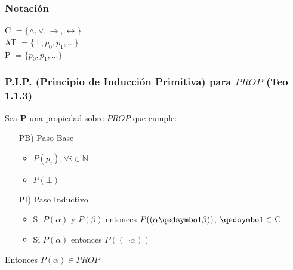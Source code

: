 \documentclass[article,12pt]{report}
\newcommand{\bd}[1]{\mathbf{#1}}
\newcommand{\NN}{\mathbb{N}}
\begin{document}
\subsubsection*{Notación}
C $= \{\wedge, \vee, \rightarrow, \leftrightarrow \}$\\
AT $= \{\bot, p_0, p_1, ...\}$\\
P $= \{ p_0, p_1, ...\}$

\subsubsection*{P.I.P. (Principio de Inducción Primitiva) para $PROP$ (Teo 1.1.3)}
Sea $\bd{P}$ una propiedad sobre $PROP$ que cumple:
\begin{itemize}
  \item[PB)] Paso Base
  \begin{itemize}
    \item $P(p_i), \forall i \in \NN$
    \item $P(\bot)$
  \end{itemize}
  \item[PI)] Paso Inductivo
  \begin{itemize}
    \item Si $P(\alpha)$ y $P(\beta)$ entonces $P((\alpha \qedsymbol \beta))$, $\qedsymbol \in $ C
    \item Si $P(\alpha)$ entonces $P((\neg \alpha))$
  \end{itemize}
\end{itemize}
Entonces $P(\alpha) \in PROP$
\end{document}

